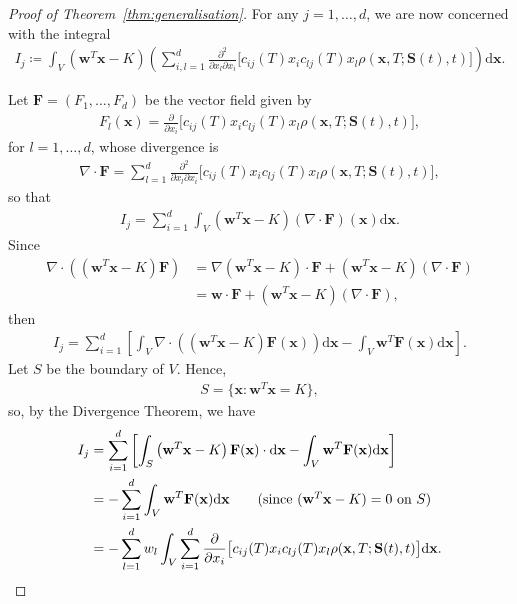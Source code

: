 \documentclass[english]{article}
\numberwithin{equation}{section}
\numberwithin{figure}{section}
\theoremstyle{bolddescit}
\theoremstyle{definition}
\theoremstyle{definition}
\theoremstyle{plain}
\theoremstyle{plain}
\theoremstyle{bolddesc}
\theoremstyle{plain}
\theoremstyle{remark}
\begin{document}
\begin{proof}[Proof of Theorem~\ref{thm:generalisation}]
  For any $j = 1,\ldots,d$, we are now concerned with the integral
  \begin{align*}
    I_j \coloneqq \int_V \left(\mathbf{w}^T \mathbf{x} - K\right) \left( \sum_{i,l=1}^{d} \frac{\partial^2}{\partial x_l \partial x_i}\big[c_{ij}(T) x_i c_{lj}(T) x_l \rho(\mathbf{x},T;\mathbf{S}(t),t)\big] \right) \mathrm{d}\mathbf{x}.
  \end{align*}

  Let $\mathbf{F} = (F_1,\ldots,F_d)$ be the vector field given by
  \begin{align*}
    F_l(\mathbf{x}) = \frac{\partial}{\partial x_i} \big[c_{ij}(T) x_i c_{lj}(T) x_l \rho(\mathbf{x},T;\mathbf{S}(t),t)\big],
  \end{align*}
  for $l=1,\ldots,d$, whose divergence is
  \begin{align*}
    \nabla \cdot \mathbf{F} = \sum_{l=1}^{d} \frac{\partial^2}{\partial x_l \partial x_i}\big[c_{ij}(T) x_i c_{lj}(T) x_l \rho(\mathbf{x},T;\mathbf{S}(t),t)\big],
  \end{align*}
  so that
  \begin{align*}
    I_j = \sum_{i=1}^{d} \int_V \left(\mathbf{w}^T \mathbf{x} - K\right) (\nabla \cdot \mathbf{F})(\mathbf{x}) \mathrm{d}\mathbf{x}.
  \end{align*}
  Since
  \begin{align*}
    \nabla \cdot ((\mathbf{w}^T \mathbf{x} - K) \mathbf{F})
    &= \nabla (\mathbf{w}^T \mathbf{x} - K) \cdot \mathbf{F} + (\mathbf{w}^T \mathbf{x} - K) (\nabla \cdot \mathbf{F})\\
    &= \mathbf{w} \cdot \mathbf{F} + (\mathbf{w}^T \mathbf{x} - K) (\nabla \cdot \mathbf{F}),
  \end{align*}
  then
  \begin{align*}
    I_j = \sum_{i=1}^{d} \left[\int_V \nabla \cdot \left(\left(\mathbf{w}^T \mathbf{x} - K\right) \mathbf{F}(\mathbf{x})\right) \mathrm{d}\mathbf{x} - \int_V \mathbf{w}^T \mathbf{F}(\mathbf{x}) \mathrm{d}\mathbf{x} \right].
  \end{align*}
  Let $S$ be the boundary of $V$. Hence,
  \begin{align*}
    S = \{\mathbf{x} : \mathbf{w}^T \mathbf{x} = K\},
  \end{align*}
  so, by the Divergence Theorem, we have
  \begin{align*}
    I_j &= \sum_{i=1}^{d} \left[\int_S \left(\mathbf{w}^T \mathbf{x} - K\right) \mathbf{F}(\mathbf{x}) \cdot \mathrm{d}\mathbf{x} - \int_V \mathbf{w}^T \mathbf{F}(\mathbf{x}) \mathrm{d}\mathbf{x} \right]\\
    &= - \sum_{i=1}^{d} \int_V \mathbf{w}^T \mathbf{F}(\mathbf{x}) \mathrm{d}\mathbf{x} \tag{since $(\mathbf{w}^T \mathbf{x} - K) = 0$ on $S$}\\
    &= - \sum_{l=1}^{d} w_l \int_V \sum_{i=1}^d \frac{\partial}{\partial x_i} \big[c_{ij}(T) x_i c_{lj}(T) x_l \rho(\mathbf{x},T;\mathbf{S}(t),t)\big] \mathrm{d}\mathbf{x}.
  \end{align*}


\end{proof}
\end{document}
